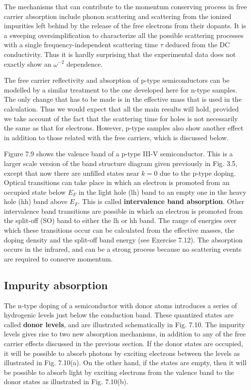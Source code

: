 \documentclass[12pt]{book}
\begin{document}
{The mechanisms that can contribute to the momentum conserving process in free carrier absorption include phonon scattering and scattering from the ionized impurities left behind by the release of the free electrons from their dopants. It is a sweeping oversimplification to characterize all the possible scattering processes with a single frequency-independent scattering time $\tau$ deduced from the DC conductivity. Thus it is hardly surprising that the experimental data does not exactly show an $\omega^{-2}$ dependence.

The free carrier reflectivity and absorption of p-type semiconductors can be modelled by a similar treatment to the one developed here for n-type samples. The only change that has to be made is in the effective mass that is used in the calculation. Thus we would expect that all the main results will hold, provided we take account of the fact that the scattering time for holes is not necessarily the same as that for electrons. However, p-type samples also show another effect in addition to those related with the free carriers, which is discussed below.

Figure 7.9 shows the valence band of a p-type III-V semiconductor. This is a larger scale version of the band structure diagram given previously in Fig. 3.5, except that now there are unfilled states near $k = 0$ due to the p-type doping. Optical transitions can take place in which an electron is promoted from an occupied state below $E_F$ in the light hole (lh) band to an empty one in the heavy hole (hh) band above $E_F$. This is called \textbf{intervalence band absorption}. Other intervalence band transitions are possible in which an electron is promoted from the split-off (SO) band to either the lh or hh band. The range of energies over which these transitions occur can be calculated from the effective masses, the doping density and the split-off band energy (see Exercise 7.12). The absorption occurs in the infrared, and can be a strong process because no scattering events are required to conserve momentum.

\subsection{Impurity absorption}
The n-type doping of a semiconductor with donor atoms introduces a series of hydrogenic levels just below the conduction band. These quantized states are called \textbf{donor levels}, and are illustrated schematically in Fig. 7.10. The impurity levels gives rise to two new absorption mechanisms, in addition to any of the free carrier effects discussed in the previous section. If the donor states are occupied, it will be possible to absorb photons by exciting electrons between the levels as illustrated in Fig. 7.10(a). On the other hand, if the states are empty, then it will be possible to absorb light by exciting electrons from the valence band to the donor states as illustrated in Fig. 7.10(b).

}
\end{document}
